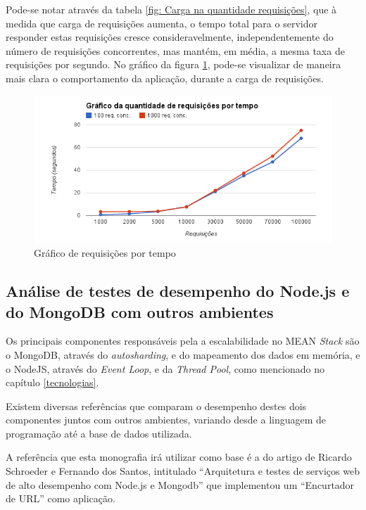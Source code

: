 Pode-se notar através da tabela \ref{fig: Carga na quantidade requisições}, que à medida que carga de requisições aumenta, o tempo  total para o servidor responder estas requisições cresce consideravelmente, independentemente do número de requisições concorrentes, mas mantém, em média, a mesma taxa de requisições por segundo. No gráfico da figura \ref{fig: Gráfico de requisições por tempo}, pode-se visualizar de maneira mais clara o comportamento da aplicação, durante a carga de requisições.  
    \begin{figure}[htb]
    \centering
    \includegraphics[scale=0.7]{images/reqxtempo.png}
    \caption{Gráfico de requisições por tempo}
    \label{fig: Gráfico de requisições por tempo}
    \end{figure}

\newpage

\subsection{Análise de testes de desempenho do Node.js e do MongoDB com outros ambientes}
Os principais componentes responsáveis pela a escalabilidade no MEAN \textit{Stack} são o MongoDB, através do \textit{autosharding}, e do mapeamento dos dados em memória, e o NodeJS, através do \textit{Event Loop}, e da \textit{Thread Pool}, como mencionado no capítulo \ref{tecnologias}.
    
Existem diversas referências que comparam o desempenho destes dois componentes juntos com outros ambientes, variando desde a linguagem de programação até a base de dados utilizada.

A referência que esta monografia irá utilizar como base é a do artigo de Ricardo Schroeder e Fernando dos Santos,  intitulado ``Arquitetura e testes de serviços web de alto desempenho com Node.js e Mongodb'' \cite{NodejsEMongodb} que implementou um ``Encurtador de URL'' como aplicação.

